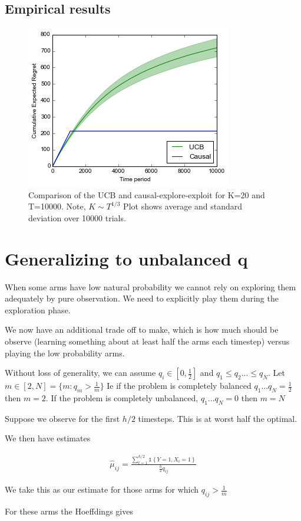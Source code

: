 \documentclass{article}
\newcommand{\set}[1]{\left\{#1\right\}}
\newcommand{\ind}[1]{\mathds{1}\!\!\set{#1}}
\newcommand{\eqn}[1]{\begin{align}#1\end{align}}
\theoremstyle{plain}
\theoremstyle{definition}
\begin{document}
\subsection*{Empirical results}
\begin{figure}[H]
\centering
\caption{Comparison of the UCB and causal-explore-exploit for K=20 and T=10000. Note, $K \sim T^{1/3}$ Plot shows average and standard deviation over 10000 trials.}
\includegraphics[width=.5\textwidth]{explore_exploit}
\end{figure}

\section{Generalizing to unbalanced $\boldsymbol{q}$}

When some arms have low natural probability we cannot rely on exploring them adequately by pure observation. We need to explicitly play them during the exploration phase. 

We now have an additional trade off to make, which is how much should be observe (learning something about at least half the arms each timestep) versus playing the low probability arms. 

Without loss of generality, we can assume $q_i \in [0,\frac{1}{2}]$ and $q_1 \leq q_2 ... \leq q_N$. Let $m \in [2,N] = \{m:q_m > \frac{1}{m}\}$ Ie if the problem is completely balanced $q_1...q_N = \frac{1}{2}$ then $m = 2$. If the problem is completely unbalanced, $q_1...q_N = 0$ then $m=N$

Suppose we observe for the first $h/2$ timesteps. This is at worst half the optimal. 

We then have estimates 

\eqn {
\hat{\mu}_{ij} = \frac{\sum_{t=1}^{h/2}\ind{Y=1,X_i=1}}{\frac{h}{2}q_{ij}}
}

We take this as our estimate for those arms for which $q_{ij} > \frac{1}{m}$

For these arms the Hoeffdings gives 
\end{document}
